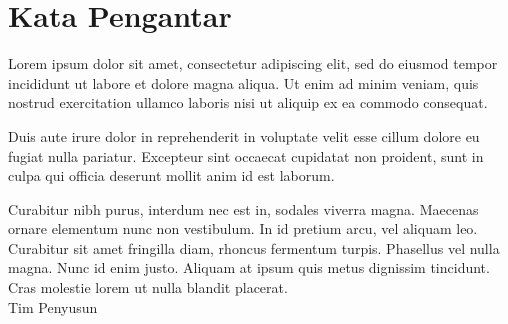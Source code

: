 {}

\section*{Kata Pengantar}
Lorem ipsum dolor sit amet, consectetur adipiscing elit, sed do eiusmod tempor incididunt ut labore et dolore magna aliqua. Ut enim ad minim veniam, quis nostrud exercitation ullamco laboris nisi ut aliquip ex ea commodo consequat.

Duis aute irure dolor in reprehenderit in voluptate velit esse cillum dolore eu fugiat nulla pariatur. Excepteur sint occaecat cupidatat non proident, sunt in culpa qui officia deserunt mollit anim id est laborum.

Curabitur nibh purus, interdum nec est in, sodales viverra magna. Maecenas ornare elementum nunc non vestibulum. In id pretium arcu, vel aliquam leo. Curabitur sit amet fringilla diam, rhoncus fermentum turpis. Phasellus vel nulla magna. Nunc id enim justo. Aliquam at ipsum quis metus dignissim tincidunt. Cras molestie lorem ut nulla blandit placerat.\\

\vspace*{4ex}
\noindent Tim Penyusun 